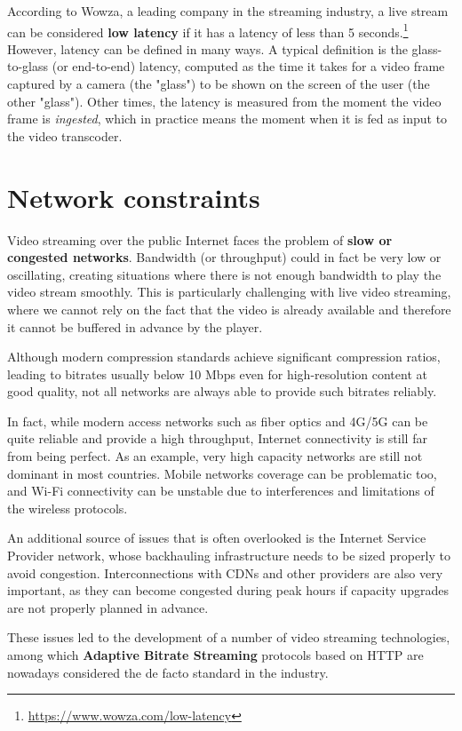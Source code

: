 According to Wowza, a leading company in the streaming industry, a live stream can be considered \textbf{low latency} if it has a latency of less than 5 seconds.\footnote{\url{https://www.wowza.com/low-latency}} However, latency can be defined in many ways. A typical definition is the glass-to-glass (or end-to-end) latency, computed as the time it takes for a video frame captured by a camera (the "glass") to be shown on the screen of the user (the other "glass"). Other times, the latency is measured from the moment the video frame is \textit{ingested}, which in practice means the moment when it is fed as input to the video transcoder.

\section{Network constraints}
\label{sec:intro/networks}

Video streaming over the public Internet faces the problem of \textbf{slow or congested networks}. Bandwidth (or throughput) could in fact be very low or oscillating, creating situations where there is not enough bandwidth to play the video stream smoothly. This is particularly challenging with live video streaming, where we cannot rely on the fact that the video is already available and therefore it cannot be buffered in advance by the player.

Although modern compression standards achieve significant compression ratios, leading to bitrates usually below 10 Mbps even for high-resolution content at good quality, not all networks are always able to provide such bitrates reliably.

In fact, while modern access networks such as fiber optics and 4G/5G can be quite reliable and provide a high throughput, Internet connectivity is still far from being perfect. As an example, very high capacity networks are still not dominant in most countries. Mobile networks coverage can be problematic too, and Wi-Fi connectivity can be unstable due to interferences and limitations of the wireless protocols.

An additional source of issues that is often overlooked is the Internet Service Provider network, whose backhauling infrastructure needs to be sized properly to avoid congestion. Interconnections with CDNs and other providers are also very important, as they can become congested during peak hours if capacity upgrades are not properly planned in advance.

These issues led to the development of a number of video streaming technologies, among which \textbf{Adaptive Bitrate Streaming} protocols based on HTTP are nowadays considered the de facto standard in the industry.\cite{bitmovin}

